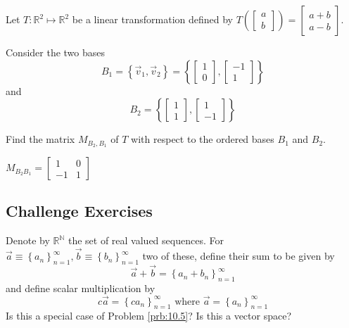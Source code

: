 \documentclass{ximera}
\begin{document}
\begin{problem}\label{prb:10.106}
Let $T: \mathbb{R}^2 \mapsto \mathbb{R}^2$ be a linear transformation defined by $T \left( \left[ \begin{array}{r}
a \\
b
\end{array} \right] \right) = \left[ \begin{array}{r}
a+b \\
a-b
\end{array} \right]$.

Consider the two bases
\[
B_1 = \left\{ \vec{v}_{1}, \vec{v}_{2} \right\} = \left\{ \left[ \begin{array}{r}
1 \\
0
\end{array}\right], \left[ \begin{array}{r}
-1 \\
1
\end{array}
\right]
\right\}
\]
 and
\[
B_2 = \left\{ \left[ \begin{array}{r}
1 \\
1
\end{array}
\right], \left[ \begin{array}{r}
1 \\
-1
\end{array}
\right]
\right\}
\]

Find the matrix $M_{B_2,B_1}$ of $T$ with respect to the ordered bases $B_1$ and $B_2$.
\begin{hint}
$
M_{B_{2} B_{1}} = \left[
\begin{array}{rr}
 1 & 0 \\
 -1 & 1
\end{array}
\right] $
\end{hint}
\end{problem}

\subsection*{Challenge Exercises}
\begin{problem}\label{prb:10.6} Denote by $\mathbb{R}^{\mathbb{N}}$ the set of real valued sequences.
For $\vec{a}\equiv \left\{ a_{n}\right\} _{n=1}^{\infty },\vec{b}\equiv
\left\{ b_{n}\right\} _{n=1}^{\infty }$ two of these, define their sum to be
given by
\begin{equation*}
\vec{a}+\vec{b} =  \left\{ a_{n}+b_{n}\right\} _{n=1}^{\infty }
\end{equation*}
and define scalar multiplication by
\begin{equation*}
c\vec{a}=\left\{ ca_{n}\right\} _{n=1}^{\infty }\text{ where }\vec{a}
=\left\{ a_{n}\right\} _{n=1}^{\infty }
\end{equation*}
Is this a special case of Problem \ref{prb:10.5}? Is this a vector space?
\end{problem}
\end{document}
